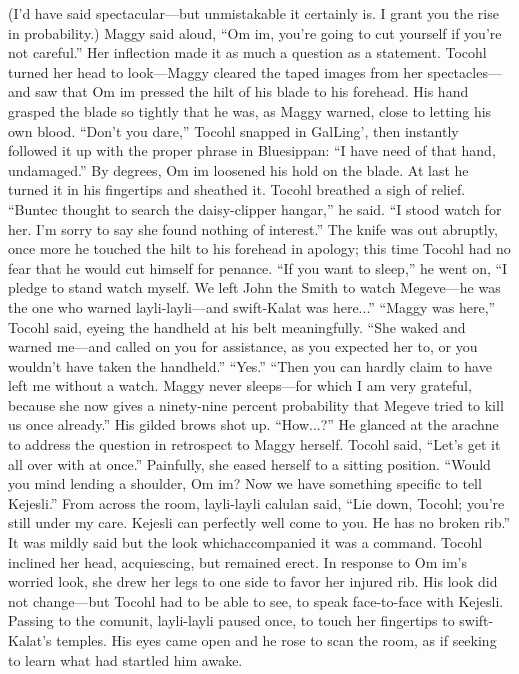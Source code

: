 \documentclass[9pt]{article}
\begin{document}
(I’d have said spectacular—but unmistakable it certainly is. I grant you the rise in probability.)
Maggy said aloud, “Om im, you’re going to cut yourself if you’re not careful.” Her inflection made it
as much a question as a statement.
Tocohl turned her head to look—Maggy cleared the taped images from her spectacles—and saw
that Om im pressed the hilt of his blade to his forehead. His hand grasped the blade so tightly that he
was, as Maggy warned, close to letting his own blood.
“Don’t you dare,” Tocohl snapped in GalLing’, then instantly followed it up with the proper phrase in
Bluesippan: “I have need of that hand, undamaged.”
By degrees, Om im loosened his hold on the blade. At last he turned it in his fingertips and sheathed
it. Tocohl breathed a sigh of relief.
“Buntec thought to search the daisy-clipper hangar,” he said. “I stood watch for her. I’m sorry to say
she found nothing of interest.” The knife was out abruptly, once more he touched the hilt to his forehead
in apology; this time Tocohl had no fear that he would cut himself for penance.
“If you want to sleep,” he went on, “I pledge to stand watch myself. We left John the Smith to watch
Megeve—he was the one who warned layli-layli—and swift-Kalat was here...”
“Maggy was here,” Tocohl said, eyeing the handheld at his belt meaningfully. “She waked and
warned me—and called on you for assistance, as you expected her to, or you wouldn’t have taken the
handheld.”
“Yes.”
“Then you can hardly claim to have left me without a watch. Maggy never sleeps—for which I am
very grateful, because she now gives a ninety-nine percent probability that Megeve tried to kill us once
already.”
His gilded brows shot up. “How...?” He glanced at the arachne to address the question in retrospect
to Maggy herself.
Tocohl said, “Let’s get it all over with at once.” Painfully, she eased herself to a sitting position.
“Would you mind lending a shoulder, Om im? Now we have something specific to tell Kejesli.”
From across the room, layli-layli calulan said, “Lie down, Tocohl; you’re still under my care.
Kejesli can perfectly well come to you. He has no broken rib.” It was mildly said but the look whichaccompanied it was a command.
Tocohl inclined her head, acquiescing, but remained erect. In response to Om im’s worried look, she
drew her legs to one side to favor her injured rib. His look did not change—but Tocohl had to be able to
see, to speak face-to-face with Kejesli.
Passing to the comunit, layli-layli paused once, to touch her fingertips to swift-Kalat’s temples. His
eyes came open and he rose to scan the room, as if seeking to learn what had startled him awake.
\end{document}
